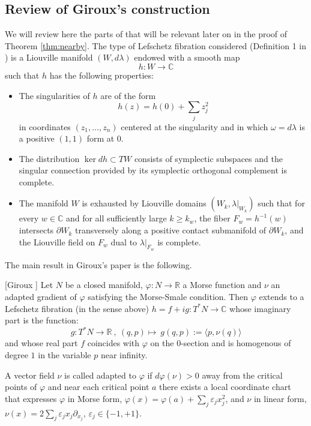 \subsection{Review of Giroux's construction}\label{subsec:Giroux} We will review here the parts of \cite{Gir:Lef-cot} that will be relevant later on in the proof of Theorem \ref{thm:nearby}. The type of Lefschetz fibration considered (Definition 1 in \cite{Gir:Lef-cot}) is a Liouville manifold $(W, d\lambda)$ endowed
with a smooth map 
$$h\colon W\to \mathbb{C}$$
such that $h$ has the following properties: 
\begin{itemize}
\item[1.] The singularities of $h$ are of the form 
$$h(z)=h(0)+\sum_{j}z^{2}_{j} $$ in coordinates $(z_{1},\ldots, z_{n})$ centered at the singularity and in which $\omega=d\lambda$ is a positive $(1,1)$ form at $0$.
\item[2.] The distribution $\ker  dh \subset TW$ consists of symplectic subspaces and the singular connection provided by its symplectic orthogonal complement is complete.
\item[3.]  The manifold $W$ is exhausted by Liouville domains $(W_{k}, \lambda|_{W_{k}})$ such that for
every $w\in \mathbb{C}$ and for all sufficiently large $k\geq k_{w}$, the fiber $F_{w}=h^{-1}(w)$
intersects $\partial W_{k}$ transversely along a positive contact submanifold of $\partial W_{k}$, and
the Liouville field on $F_{w}$ dual to $\lambda|_{F_{w}}$ is complete.
\end{itemize}

The main result in Giroux's paper is the following.

\begin{thm}\label{thm:gir}[Giroux \cite{Gir:Lef-cot}] Let $N$ be a closed manifold, $\varphi:N\to \mathbb{R}$ a Morse function and $\nu$ an adapted gradient of $\varphi$ satisfying the Morse-Smale condition. Then $\varphi$ extends to a Lefschetz fibration (in the sense above) $h=f+i g\colon T^{\ast}N\to \mathbb{C}$ whose imaginary part is the function:
$$ g\colon T^{\ast}N\to \mathbb{R}\ ,\  (q,p) \mapsto\ g(q,p):=  \langle p, \nu (q)\rangle$$
and whose real part $f$ coincides with $\varphi$ on the $0$-section and is homogenous of degree $1$ in the variable $p$ near infinity.
\end{thm}

A vector field $\nu$ is called adapted to $\varphi$ if $d\varphi(\nu) >0$ away from the critical points of $\varphi$ and near each critical point $a$ there exists
a local coordinate chart that expresses $\varphi$ in Morse form, $\varphi(x)=\varphi(a)+\sum_{j} \varepsilon_{j} x^{2}_{j}$, and $\nu$ in linear 
form, $\nu(x)=2\sum_{j}\varepsilon_{j}x_{j}\partial_{x_{j}}$, $\varepsilon_{j}\in \{-1,+1\}$.


